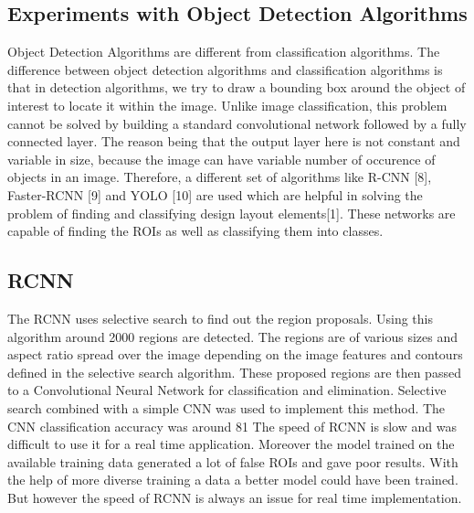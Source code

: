     \subsection{Experiments with Object Detection Algorithms}
      Object Detection Algorithms are different from classification algorithms. The difference between object detection algorithms and classification algorithms is that in detection algorithms, we try to draw a bounding box around the object of interest to locate it within the image. Unlike image classification, this problem cannot be solved by building a standard convolutional network followed by a fully connected layer. The reason being that the output layer here is not constant and variable in size, because the image can have variable number of occurence of objects in an image. Therefore, a different set of algorithms like R-CNN [8], Faster-RCNN [9] and YOLO [10] are used which are helpful in solving the problem of finding and classifying design layout elements[1]. These networks are capable of finding the ROIs as well as classifying them into classes.

    \subsection{RCNN}
      The RCNN uses selective search to find out the region proposals. Using this algorithm around 2000 regions are detected. The regions are of various sizes and aspect ratio spread over the image depending on the image features and contours defined in the selective search algorithm. These proposed regions are then passed to a Convolutional Neural Network for classification and elimination.
      Selective search combined with a simple CNN was used to implement this method. The CNN classification accuracy was around 81%
      The speed of RCNN is slow and was difficult to use it for a real time application. Moreover the model trained on the available training data generated a lot of false ROIs and gave poor results. With the help of more diverse training a data a better model could have been trained. But however the speed of RCNN is always an issue for real time implementation.

